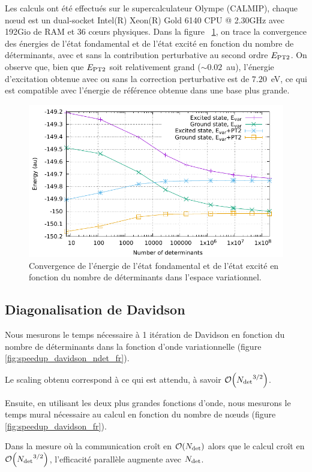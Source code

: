 \documentclass[./thesis.tex]{subfiles}
\begin{document}
Les calculs ont été effectués sur le supercalculateur Olympe (CALMIP), chaque nœud est un dual-socket Intel(R) Xeon(R) Gold 6140 CPU @ 2.30GHz avec 192Gio de RAM et 36 cœurs physiques.
Dans la figure ~\ref{fig:energy_pt2_fr}, on trace la convergence des énergies de l'état fondamental et de l'état excité en fonction du nombre de déterminants, avec et sans la contribution perturbative au second ordre $E_\text{PT2}$.
On observe que, bien que $E_\text{PT2}$ soit relativement grand ($\sim 0.02$~au), l'énergie d'excitation obtenue avec ou sans la correction perturbative est de $7.20$~eV, ce qui est compatible avec l'énergie de référence obtenue dans une base plus grande.
\begin{figure}[h!]
        \begin{center}
                \includegraphics[width=0.75\columnwidth]{figures/perf/cn3_energy}
                \caption{               
                Convergence de l'énergie de l'état fondamental et de l'état excité en fonction du nombre de déterminants dans l'espace variationnel.}
                \label{fig:energy_pt2_fr}
        \end{center}
\end{figure}
\subsection{Diagonalisation de Davidson}
Nous mesurons le temps nécessaire à 1 itération de Davidson en fonction du nombre de déterminants dans la fonction d'onde variationnelle (figure \ref{fig:speedup_davidson_ndet_fr}).

Le scaling obtenu correspond à ce qui est attendu, à savoir  $\order{\Ndet^{3/2}}$.

Ensuite, en utilisant les deux plus grandes fonctions d'onde, nous mesurons le temps mural nécessaire au calcul en fonction du nombre de nœuds (figure \ref{fig:speedup_davidson_fr}).

Dans la mesure où la communication croît en $\order{\Ndet}$ alors que le calcul croît en $\order{\Ndet^{3/2}}$, l'efficacité parallèle augmente avec ${N_\text{det}}$.
\end{document}
